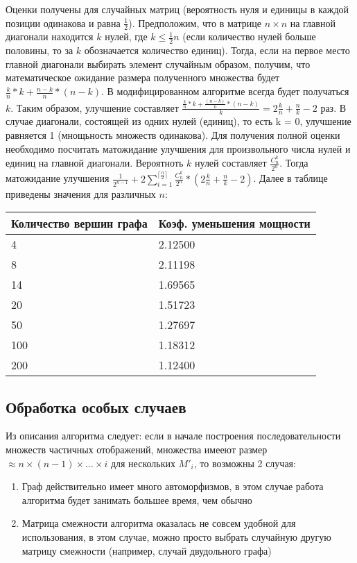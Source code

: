 Оценки получены для случайных матриц (вероятность нуля и единицы в каждой позиции
одинакова и равна $\frac{1}{2}$).
Предположим, что в матрице $n\times n$ на главной диагонали находится $k$ нулей, где $k \leq \frac{1}{2} n$ (если количество нулей больше половины, то за $k$ обозначается количество единиц).
Тогда, если на первое место главной диагонали выбирать элемент случайным образом,
получим, что математическое ожидание размера полученного множества будет $\frac{k}{n}*k + \frac{n-k}{n}*(n-k)$.
В модифицированном алгоритме всегда будет получаться $k$. Таким образом,
улучшение составляет $\frac{\frac{k}{n} * k + \frac{(n-k)}{n} * (n-k)} {k} = 2 \frac{k}{n} + \frac{n}{k} - 2$ раз. В случае диагонали,
состоящей из одних нулей (единиц), то есть k = 0, улучшение равняется 1 (мнощьность
множеств одинакова).
Для получения полной оценки необходимо посчитать матожидание улучшения для
произвольного числа нулей и единиц на главной диагонали. Вероятноть $k$ нулей
составляет $\frac{C_n^k}{2^n}$. Тогда матожидание улучшения $\frac{1}{2^{n-1}} + 2 \sum\limits_{i=1}^{\lceil\frac{n}{2}\rceil} \frac{C_n^k}{2^n} * (2\frac{k}{n} + \frac{n}{k} - 2)$.
Далее в таблице приведены значения для различных $n$:

\begin{tabular}[t]{||l|l||}
\hline
Количество вершин графа & Коэф. уменьшения мощности \\
\hline
4 &  2.12500 \\
\hline
8 & 2.11198 \\
\hline
14 & 1.69565 \\
\hline
20 & 1.51723 \\
\hline
50 & 1.27697 \\
\hline
100 & 1.18312 \\
\hline
200 & 1.12400 \\
\hline
\end{tabular}

\subsection{Обработка особых случаев}
Из описания алгоритма следует: если в начале построения последовательности множеств частичных отображений, множества имееют размер $\approx n \times (n-1) \times \ldots \times i$ для нескольких $M'_i$, то возможны 2 случая:

\begin{enumerate}
\item Граф действительно имеет много автоморфизмов, в этом случае работа алгоритма будет занимать большее время, чем обычно 

\item Матрица смежности алгоритма оказалась не совсем удобной для использования, в этом случае, можно просто выбрать случайную другую матрицу смежности (например, случай двудольного графа)
\end{enumerate} 

